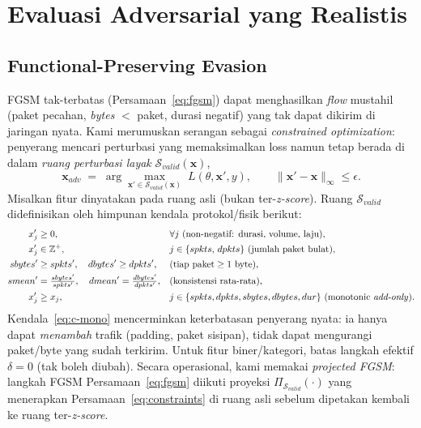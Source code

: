 \documentclass[11pt,a4paper]{article}
\begin{document}
\section{Evaluasi Adversarial yang Realistis}

\subsection{Functional-Preserving Evasion}
\label{sec:fpe}

FGSM tak-terbatas (Persamaan~\eqref{eq:fgsm}) dapat menghasilkan \emph{flow}
mustahil (paket pecahan, \emph{bytes} $<$ paket, durasi negatif) yang tak dapat
dikirim di jaringan nyata. Kami merumuskan serangan sebagai \emph{constrained
optimization}: penyerang mencari perturbasi yang memaksimalkan loss namun tetap
berada di dalam \emph{ruang perturbasi layak} $\mathcal{S}_{valid}(\mathbf{x})$,
\begin{equation}
\label{eq:fpe-opt}
\mathbf{x}_{adv} \;=\; \arg\max_{\mathbf{x}' \in \mathcal{S}_{valid}(\mathbf{x})}\;
L\!\left(\theta,\mathbf{x}',y\right),
\qquad
\|\mathbf{x}' - \mathbf{x}\|_\infty \le \epsilon .
\end{equation}
Misalkan fitur dinyatakan pada ruang asli (bukan ter-\emph{z-score}). Ruang
$\mathcal{S}_{valid}$ didefinisikan oleh himpunan kendala protokol/fisik berikut:
\begin{subequations}
\label{eq:constraints}
\begin{align}
x'_j &\ge 0, && \forall j \ \text{(non-negatif: durasi, volume, laju)}, \label{eq:c-nonneg}\\
x'_j &\in \mathbb{Z}^{+}, && j \in \{spkts,\, dpkts\} \ \text{(jumlah paket bulat)}, \label{eq:c-int}\\
sbytes' &\ge spkts', \quad dbytes' \ge dpkts', && \text{(tiap paket} \ge 1 \ \text{byte)}, \label{eq:c-consistency}\\
smean' &= \tfrac{sbytes'}{spkts'}, \quad dmean' = \tfrac{dbytes'}{dpkts'}, && \text{(konsistensi rata-rata)}, \label{eq:c-mean}\\
x'_j &\ge x_j, && j \in \{spkts, dpkts, sbytes, dbytes, dur\} \ \text{(monotonic \emph{add-only})}. \label{eq:c-mono}
\end{align}
\end{subequations}
Kendala~\eqref{eq:c-mono} mencerminkan keterbatasan penyerang nyata: ia hanya
dapat \emph{menambah} trafik (padding, paket sisipan), tidak dapat mengurangi
paket/byte yang sudah terkirim. Untuk fitur biner/kategori, batas langkah
efektif $\delta = 0$ (tak boleh diubah). Secara operasional, kami memakai
\emph{projected FGSM}: langkah FGSM Persamaan~\eqref{eq:fgsm} diikuti proyeksi
$\Pi_{\mathcal{S}_{valid}}(\cdot)$ yang menerapkan Persamaan~\eqref{eq:constraints}
di ruang asli sebelum dipetakan kembali ke ruang ter-\emph{z-score}.
\end{document}
